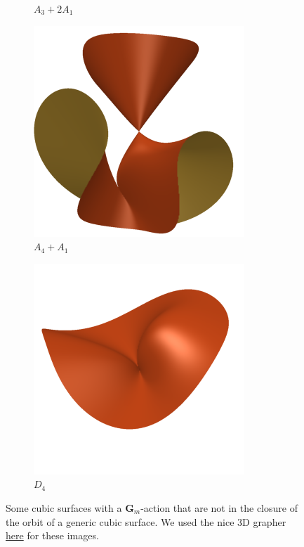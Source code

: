 \documentclass[12pt,reqno]{amsart}
\numberwithin{equation}{section}
\newcommand{\G}{\mathbf G}
\begin{document}
\begin{figure}
\begin{subfigure}{.24\textwidth}
    \caption{$A_3+2A_1$}
  \end{subfigure}
  \begin{subfigure}{.24\textwidth}
    \centering
    \includegraphics[width=\textwidth]{cubicA4_A1}
    \caption{$A_4+A_1$}
  \end{subfigure}
  \begin{subfigure}{.24\textwidth}
    \centering
    \includegraphics[width=\textwidth]{cubicD4}
    \caption{$D_4$}
  \end{subfigure}
  \caption{Some cubic surfaces with a $\G_m$-action that are not in
    the closure of the orbit of a generic cubic surface. We used the
    nice 3D grapher
    \href{https://singsurf.org/parade/Cubics.php}{here} for these
    images.}
  \label{fig:surfaces}
\end{figure}
\end{document}
